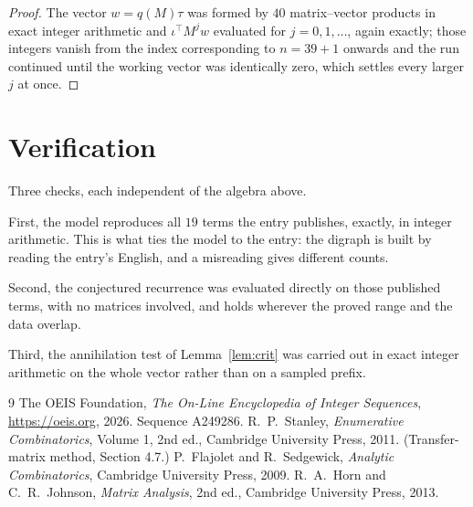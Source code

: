 \documentclass[11pt,a4paper]{article}
\theoremstyle{plain}
\theoremstyle{definition}
\begin{document}
\begin{proof}
The vector $w=q(M)\tau$ was formed by $40$ matrix--vector products in exact integer
arithmetic and $\iota^{\!\top}M^{j}w$ evaluated for $j=0,1,\dots$, again exactly; those
integers vanish from the index corresponding to $n=39+1$ onwards and the run continued
until the working vector was identically zero, which settles every larger $j$ at once.
\end{proof}

\section{Verification}

Three checks, each independent of the algebra above.

First, the model reproduces all $19$ terms the entry publishes, exactly, in integer
arithmetic. This is what ties the model to the entry: the digraph is built by reading the
entry's English, and a misreading gives different counts.

Second, the conjectured recurrence was evaluated directly on those published terms, with no
matrices involved, and holds wherever the proved range and the data overlap.

Third, the annihilation test of Lemma~\ref{lem:crit} was carried out in exact integer
arithmetic on the whole vector rather than on a sampled prefix.

\begin{thebibliography}{9}
 The OEIS Foundation, \emph{The On-Line Encyclopedia of Integer
Sequences}, \url{https://oeis.org}, 2026. Sequence A249286.
 R.~P.~Stanley, \emph{Enumerative Combinatorics}, Volume 1, 2nd ed.,
Cambridge University Press, 2011. (Transfer-matrix method, Section 4.7.)
 P.~Flajolet and R.~Sedgewick, \emph{Analytic Combinatorics}, Cambridge
University Press, 2009.
 R.~A.~Horn and C.~R.~Johnson, \emph{Matrix Analysis}, 2nd ed., Cambridge
University Press, 2013.
\end{thebibliography}
\end{document}
